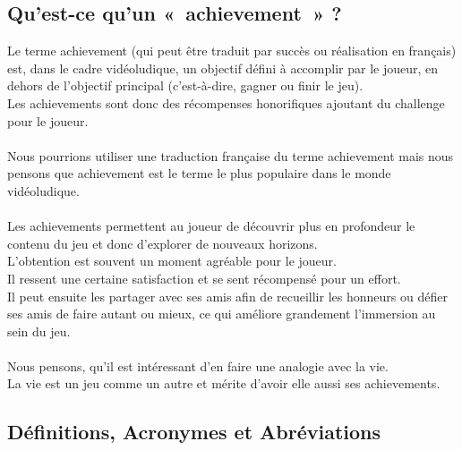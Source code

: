 \documentclass{life-fr}
\begin{document}
\subsection{Qu'est-ce qu'un «~achievement~» ?}
Le terme achievement (qui peut être traduit par succès ou réalisation en français) est, dans le cadre vidéoludique,  un objectif défini à accomplir par le joueur, en dehors de l’objectif principal (c’est-à-dire, gagner ou finir le jeu).\\
 Les achievements sont donc des récompenses honorifiques ajoutant du challenge pour le joueur.\\
\\
Nous pourrions utiliser une traduction française du terme achievement mais nous pensons que achievement est le terme le plus populaire dans le monde vidéoludique.\\
\\
Les achievements permettent au joueur de découvrir plus en profondeur le contenu du jeu et donc d’explorer de nouveaux horizons.\\
 L’obtention est souvent un moment agréable pour le joueur.\\
 Il ressent une certaine satisfaction et se sent récompensé pour un effort.\\
 Il peut ensuite les partager avec ses amis afin de recueillir les honneurs ou défier ses amis de faire autant ou mieux, ce qui améliore grandement l’immersion au sein du jeu.\\
\\
Nous pensons, qu’il est intéressant d’en faire une analogie avec la vie.\\
 La vie est un jeu comme un autre et mérite d’avoir elle aussi ses achievements.

\subsection{Définitions, Acronymes et Abréviations}
\end{document}
